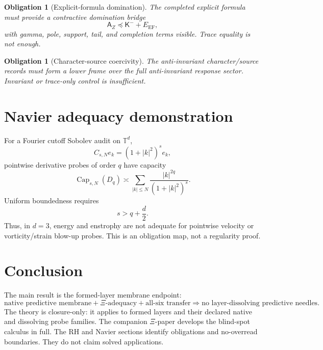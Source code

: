 \documentclass[11pt]{article}
\newtheorem{obligation}[theorem]{Obligation}
\DeclareMathOperator{\Capacity}{Cap}
\newcommand{\K}{\mathsf K}
\newcommand{\preceqq}{\preceq}
\begin{document}
\begin{obligation}[Explicit-formula domination]
The completed explicit formula must provide a contractive domination bridge
\[
  \mathsf A_Z\preceqq \K^-+E_{\mathrm{EF}},
\]
with gamma, pole, support, tail, and completion terms visible.  Trace equality is not enough.
\end{obligation}

\begin{obligation}[Character-source coercivity]
The anti-invariant character/source records must form a lower frame over the full anti-invariant response sector.  Invariant or trace-only control is insufficient.
\end{obligation}

\section{Navier adequacy demonstration}
For a Fourier cutoff Sobolev audit on \(\mathbb T^d\),
\[
  C_{s,N}e_k=(1+|k|^2)^se_k,
\]
pointwise derivative probes of order \(q\) have capacity
\[
  \Capacity_{s,N}(D_q)\asymp \sum_{|k|\le N}\frac{|k|^{2q}}{(1+|k|^2)^s}.
\]
Uniform boundedness requires
\[
  s>q+\frac d2.
\]
Thus, in \(d=3\), energy and enstrophy are not adequate for pointwise velocity or vorticity/strain blow-up probes.  This is an obligation map, not a regularity proof.

\section{Conclusion}
The main result is the formed-layer membrane endpoint:
\[
\boxed{\text{native predictive membrane}+\Xi\text{-adequacy}+\text{all-six transfer}
\Rightarrow \text{no layer-dissolving predictive needles}.}
\]
The theory is closure-only: it applies to formed layers and their declared native and dissolving probe families.  The companion \(\Xi\)-paper develops the blind-spot calculus in full.  The RH and Navier sections identify obligations and no-overread boundaries.  They do not claim solved applications.
\end{document}

